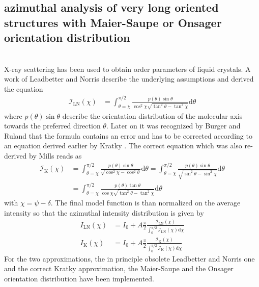 \subsection{azimuthal analysis of very long oriented structures with Maier-Saupe or Onsager orientation distribution} ~\\
\label{sec:azimuthalVeryLongStructures}
X-ray scattering has been used to obtain order parameters of liquid crystals. A work of Leadbetter and Norris \cite{Leadbetter1979} describe the underlying assumptions and derived the equation
\begin{align}
\mathcal{I}_\mathrm{LN}(\chi) &= \int_{\theta=\chi}^{\pi/2} \frac{p(\theta) \sin\theta}{\cos^2\chi \sqrt{\tan^2\theta-\tan^2\chi}} \mathrm{d}\theta
\end{align}
where $p(\theta) \sin\theta$ describe the orientation distribution of the molecular axis towards the preferred direction $\theta$. Later on it was recognized by Burger and Ruland \cite{Burger2006} that the formula contains an error and has to be corrected according to an equation derived earlier by Kratky \cite{Kratky1933}. The correct equation  which was also re-derived by Mills \cite{Mills2008} reads as \cite{Sims2018,Agra-Kooijman2017}
\begin{align}
\mathcal{I}_\mathrm{K}(\chi) &= \int_{\theta=\chi}^{\pi/2} \frac{p(\theta) \sin\theta}{\sqrt{\cos^2\chi-\cos^2\theta}} \mathrm{d}\theta = \int_{\theta=\chi}^{\pi/2} \frac{p(\theta) \sin\theta}{\sqrt{\sin^2\theta-\sin^2\chi}} \mathrm{d}\theta\\
&= \int_{\theta=\chi}^{\pi/2} \frac{p(\theta) \tan\theta}{\cos\chi \sqrt{\tan^2\theta-\tan^2\chi}} \mathrm{d}\theta
\end{align}
with $\chi = \psi-\delta$.  The final model function is than normalized on the average intensity so that the azimuthal intensity distribution is given by
\begin{align}
  I_\mathrm{LN}(\chi) &= I_0 + A \frac{\pi}{2}\frac{\mathcal{I}_\mathrm{LN}(\chi)}{\int_0^{\pi/2}\mathcal{I}_\mathrm{LN}(\chi)\mathrm{d}\chi} \\
  I_\mathrm{K}(\chi) &= I_0 + A \frac{\pi}{2}\frac{\mathcal{I}_\mathrm{K}(\chi)}{\int_0^{\pi/2}\mathcal{I}_\mathrm{K}(\chi)\mathrm{d}\chi}
\end{align}
For the two approximations, the in principle obsolete Leadbetter and Norris one and the correct Kratky approximation, the Maier-Saupe and the Onsager orientation distribution have been implemented.

